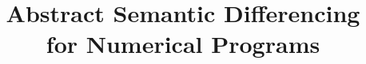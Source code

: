 \documentclass{llncs}
\begin{document}


\title{Abstract Semantic Differencing \\ for Numerical Programs}

\author{}
\institute{}

%

\maketitle




%
%
%
%
%
%
%
%




\appendix
%
\end{document}
